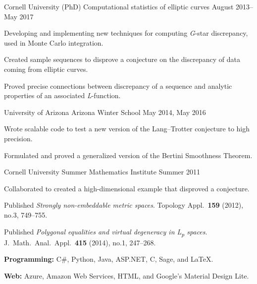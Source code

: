 \documentclass[11pt, letterpaper]{awesome-cv}
\begin{document}

\begin{cventries}

\cventry
	{Cornell University (PhD)}
	{Computational statistics of elliptic curves}
	{}
	{August 2013--May 2017}
	{
		\begin{cvitems}
			\item{Developing and implementing new techniques for computing \emph{G}-star discrepancy, used in Monte Carlo integration.}
			\item{Created sample sequences to disprove a conjecture on the discrepancy of data coming from elliptic curves.}
			\item{Proved precise connections between discrepancy of a sequence and analytic properties of an associated \emph{L}-function.}
		\end{cvitems}
	}
		
\cventry
	{University of Arizona}
	{Arizona Winter School}
	{}
	{May 2014, May 2016}
	{
		\begin{cvitems}
			\item{Wrote scalable code to test a new version of the Lang--Trotter conjecture to high precision.}
			\item{Formulated and proved a generalized version of the Bertini Smoothness Theorem.}
		\end{cvitems}
	}
	
\cventry
	{Cornell University}
	{Summer Mathematics Institute}
	{}
	{Summer 2011}
	{
		\begin{cvitems}
			\item{Collaborated to created a high-dimensional example that disproved a conjecture.}
			\item{Published \emph{Strongly non-embeddable metric spaces}. Topology Appl.~\textbf{159} (2012), no.3, 749--755.}
			\item{Published \emph{Polygonal equalities and virtual degeneracy in L\textsubscript{p} spaces}. J.~Math.~Anal.~Appl.~\textbf{415} (2014), no.1, 247--268.}
		\end{cvitems}
	}
\end{cventries}






\begin{cvparagraph}
\textbf{Programming:} C\#, Python, Java, ASP.NET, C, Sage, and \LaTeX.

\textbf{Web:} Azure, Amazon Web Services, HTML, and Google's Material Design Lite.
\end{cvparagraph}
\end{document}
